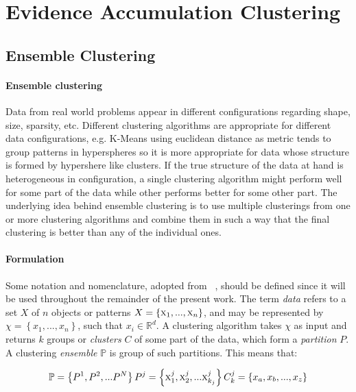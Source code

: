 \section{Evidence Accumulation Clustering}
\label{sec:eac}

\subsection{Ensemble Clustering}


\paragraph{Ensemble clustering}
Data from real world problems appear in different configurations regarding shape, size, sparsity, etc. %
Different clustering algorithms are appropriate for different data configurations, e.g. K-Means using euclidean distance as metric tends to group patterns in hyperspheres so it is more appropriate for data whose structure is formed by hypershere like clusters.%
If the true structure of the data at hand is heterogeneous in configuration, a single clustering algorithm might perform well for some part of the data while other performs better for some other part. The underlying idea behind ensemble clustering is to use multiple clusterings from one or more clustering algorithms and combine them in such a way that the final clustering is better than any of the individual ones.

\paragraph{Formulation}
Some notation and nomenclature, adopted from ~\cite{Fred2005}, should be defined since it will be used throughout the remainder of the present work. The term \emph{data} refers to a set $X$ of $n$ objects or patterns $X=\left \{ \textsc{x}_1,...,\textsc{x}_n \right \}$, and may be represented by $\chi = \left \{ x_1,...,x_n \right \}$, such that $x_i \in  \mathbb{R}^d$. A clustering algorithm takes $\chi$ as input and returns $k$ groups or \emph{clusters} $C$ of some part of the data, which form a \emph{partition} $P$. A clustering \emph{ensemble} $\mathbb{P}$ is group of such partitions. This means that:

$$
\mathbb{P} = \left \{   P^1, P^2, ... P^N   \right \} \\
P^j = \left \{   \textsc{x}^j_1, \textsc{x}^j_2, ... \textsc{x}^{j}_{k_j}   \right \} \\
C^j_k = \left \{   x_a, x_b, ..., x_z   \right \}
$$

